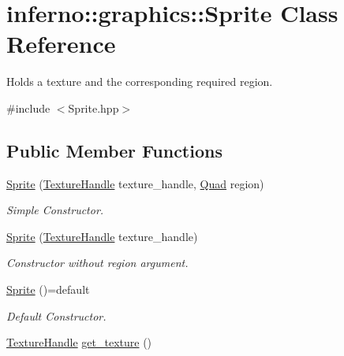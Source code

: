 \hypertarget{classinferno_1_1graphics_1_1_sprite}{}\section{inferno\+:\+:graphics\+:\+:Sprite Class Reference}
\label{classinferno_1_1graphics_1_1_sprite}


Holds a texture and the corresponding required region.  




{\ttfamily \#include $<$Sprite.\+hpp$>$}

\subsection*{Public Member Functions}
\begin{DoxyCompactItemize}
\item 
\mbox{\hyperlink{classinferno_1_1graphics_1_1_sprite_a404b45a087a04018e5e2bc5c7b59ab67}{Sprite}} (\mbox{\hyperlink{namespaceinferno_1_1graphics_a9d719bfbfedd17b9ace9b8d603ab5a38}{Texture\+Handle}} texture\+\_\+handle, \mbox{\hyperlink{classinferno_1_1graphics_1_1_quad}{Quad}} region)
\begin{DoxyCompactList}\small\item\em Simple Constructor. \end{DoxyCompactList}\item 
\mbox{\hyperlink{classinferno_1_1graphics_1_1_sprite_a8673ad1ca45d867e83355a1ad10b752a}{Sprite}} (\mbox{\hyperlink{namespaceinferno_1_1graphics_a9d719bfbfedd17b9ace9b8d603ab5a38}{Texture\+Handle}} texture\+\_\+handle)
\begin{DoxyCompactList}\small\item\em Constructor without region argument. \end{DoxyCompactList}\item 
\mbox{\label{classinferno_1_1graphics_1_1_sprite_a32f2beb808b266795f985315762e0446}} 
\mbox{\hyperlink{classinferno_1_1graphics_1_1_sprite_a32f2beb808b266795f985315762e0446}{Sprite}} ()=default
\begin{DoxyCompactList}\small\item\em Default Constructor. \end{DoxyCompactList}\item 
\mbox{\hyperlink{namespaceinferno_1_1graphics_a9d719bfbfedd17b9ace9b8d603ab5a38}{Texture\+Handle}} \mbox{\hyperlink{classinferno_1_1graphics_1_1_sprite_a40ecbad17392046d9a019405b0705011}{get\+\_\+texture}} ()

\end{DoxyCompactItemize}
